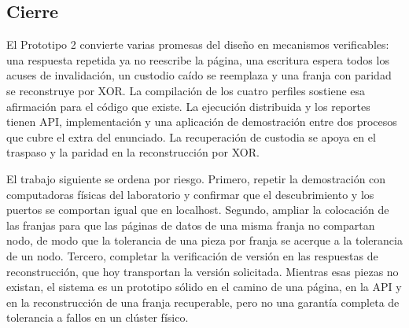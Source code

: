 \documentclass[11pt,spanish]{article}
\begin{document}
\subsection{Cierre}

El Prototipo 2 convierte varias promesas del diseño en mecanismos verificables: una respuesta repetida ya no reescribe la página, una escritura espera todos los acuses de invalidación, un custodio caído se reemplaza y una franja con paridad se reconstruye por XOR. La compilación de los cuatro perfiles sostiene esa afirmación para el código que existe. La ejecución distribuida y los reportes tienen API, implementación y una aplicación de demostración entre dos procesos que cubre el extra del enunciado. La recuperación de custodia se apoya en el traspaso y la paridad en la reconstrucción por XOR.

El trabajo siguiente se ordena por riesgo. Primero, repetir la demostración con computadoras físicas del laboratorio y confirmar que el descubrimiento y los puertos se comportan igual que en localhost. Segundo, ampliar la colocación de las franjas para que las páginas de datos de una misma franja no compartan nodo, de modo que la tolerancia de una pieza por franja se acerque a la tolerancia de un nodo. Tercero, completar la verificación de versión en las respuestas de reconstrucción, que hoy transportan la versión solicitada. Mientras esas piezas no existan, el sistema es un prototipo sólido en el camino de una página, en la API y en la reconstrucción de una franja recuperable, pero no una garantía completa de tolerancia a fallos en un clúster físico.
\end{document}
